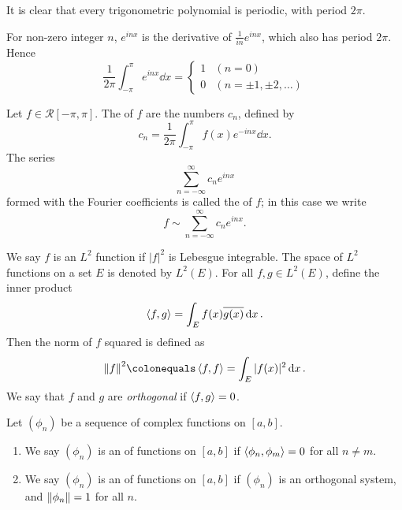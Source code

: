 It is clear that every trigonometric polynomial is periodic, with period $2\pi$.

For non-zero integer $n$, $e^{inx}$ is the derivative of $\frac{1}{in}e^{inx}$, which also has period $2\pi$. Hence
\[\frac{1}{2\pi}\int_{-\pi}^{\pi}e^{inx}\dd{x}=\begin{cases}
1&(n=0)\\
0&(n=\pm1,\pm2,\dots)
\end{cases}\]

\begin{definition}
Let $f\in\mathcal{R}[-\pi,\pi]$. The  of $f$ are the numbers $c_n$, defined by
\[c_n=\frac{1}{2\pi}\int_{-\pi}^{\pi}f(x)e^{-inx}\dd{x}.\]
The series
\[\sum_{n=-\infty}^{\infty}c_ne^{inx}\]
formed with the Fourier coefficients is called the  of $f$; in this case we write
\[f\sim\sum_{n=-\infty}^{\infty}c_ne^{inx}.\]
\end{definition}

We say $f$ is an $L^2$ function if $|f|^2$ is Lebesgue integrable. The space of $L^2$ functions on a set $E$ is denoted by $L^2(E)$. For all $f,g\in L^2(E)$, define the inner product
\[\left\langle f,g\right\rangle=\int_E f(x)\overline{g(x)}\dd{x}.\]
Then the norm of $f$ squared is defined as
\[\norm{f}^2\colonequals\angbrac{f,f}=\int_E|f(x)|^2\dd{x}.\]
We say that $f$ and $g$ are \emph{orthogonal} if $\left\langle f,g\right\rangle=0$.

\begin{definition}
Let $(\phi_n)$ be a sequence of complex functions on $[a,b]$.
\begin{enumerate}[label=(\roman*)]
\item We say $(\phi_n)$ is an  of functions on $[a,b]$ if $\left\langle\phi_n,\phi_m\right\rangle=0$ for all $n\neq m$.
\item We say $(\phi_n)$ is an  of functions on $[a,b]$ if $(\phi_n)$ is an orthogonal system, and $\norm{\phi_n}=1$ for all $n$.
\end{enumerate}
\end{definition}

